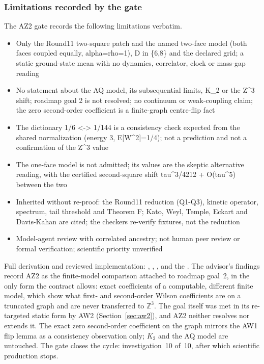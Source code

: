 \subsubsection{Limitations recorded by the gate}
\label{sec:az2-limits}
The AZ2 gate records the following limitations verbatim.
\begin{gatequote}
\begin{itemize}
\item Only the Round11 two-square patch and the named two-face model (both
faces coupled equally, alpha=rho=1), D in \{6,8\} and the declared grid; a
static ground-state mean with no dynamics, correlator, clock or mass-gap
reading
\item No statement about the AQ model, its subsequential limits, K\_2 or the
Z\textasciicircum{}3 shift; roadmap goal 2 is not resolved; no continuum or
weak-coupling claim; the zero second-order coefficient is a finite-graph
centre-flip fact
\item The dictionary 1/6 <-> 1/144 is a consistency check expected from the
shared normalization (energy 3, E[W\textasciicircum{}2]=1/4); not a prediction
and not a confirmation of the Z\textasciicircum{}3 value
\item The one-face model is not admitted; its values are the skeptic
alternative reading, with the certified second-square shift
tau\textasciicircum{}3/4212 + O(tau\textasciicircum{}5) between the two
\item Inherited without re-proof: the Round11 reduction (Q1-Q3), kinetic
operator, spectrum, tail threshold and Theorem F; Kato, Weyl, Temple, Eckart
and Davis-Kahan are cited; the checkers re-verify fixtures, not the reduction
\item Model-agent review with correlated ancestry; not human peer review or
formal verification; scientific priority unverified
\end{itemize}
\end{gatequote}
Full derivation and reviewed implementation:
,
,
,
 and the
. The advisor's
findings record AZ2 as the finite-model comparison attached to roadmap
goal~2, in the only form the contract allows: exact coefficients of a
computable, different finite model, which show what first- and second-order
Wilson coefficients are on a truncated graph and are never transferred to
$\mathbb Z^3$. The goal itself was met in its re-targeted static form by AW2
(Section~\ref{sec:aw2}), and AZ2 neither resolves nor extends it. The exact
zero second-order coefficient on the graph mirrors the AW1 flip lemma as a
consistency observation only; $K_2$ and the AQ model are untouched. The gate
closes the cycle: investigation~10 of~10, after which scientific production
stops.
